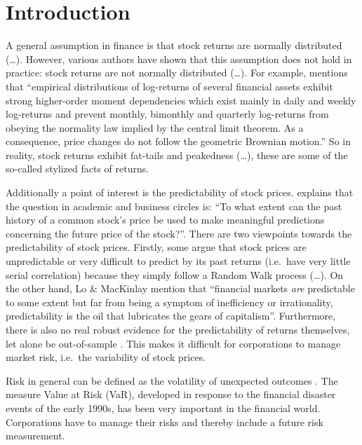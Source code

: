 \documentclass[a4paper, twoside]{templates/ociamthesis}
\begin{document}
\hypertarget{introduction}{%
\chapter*{Introduction}\label{introduction}}

\adjustmtc
{}

A general assumption in finance is that stock returns are normally distributed (\ldots). However, various authors have shown that this assumption does not hold in practice: stock returns are not normally distributed (\ldots). For example, \textcite{theodossiou2000} mentions that ``empirical distributions of log-returns of several financial assets exhibit strong higher-order moment dependencies which exist mainly in daily and weekly log-returns and prevent monthly, bimonthly and quarterly log-returns from obeying the normality law implied by the central limit theorem. As a consequence, price changes do not follow the geometric Brownian motion.'' So in reality, stock returns exhibit fat-tails and peakedness (\ldots), these are some of the so-called stylized facts of returns.

Additionally a point of interest is the predictability of stock prices. \textcite{fama1965} explains that the question in academic and business circles is: ``To what extent can the past history of a common stock's price be used to make meaningful predictions concerning the future price of the stock?''. There are two viewpoints towards the predictability of stock prices. Firstly, some argue that stock prices are unpredictable or very difficult to predict by its past returns (i.e.~have very little serial correlation) because they simply follow a Random Walk process (\ldots). On the other hand, Lo \& MacKinlay mention that ``financial markets \emph{are} predictable to some extent but far from being a symptom of inefficiency or irrationality, predictability is the oil that lubricates the gears of capitalism''. Furthermore, there is also no real robust evidence for the predictability of returns themselves, let alone be out-of-sample \autocite{welch2008}. This makes it difficult for corporations to manage market risk, i.e.~the variability of stock prices.

Risk in general can be defined as the volatility of unexpected outcomes \autocite{jorion2007}. The measure Value at Risk (VaR), developed in response to the financial disaster events of the early 1990s, has been very important in the financial world. Corporations have to manage their risks and thereby include a future risk measurement.
\end{document}
